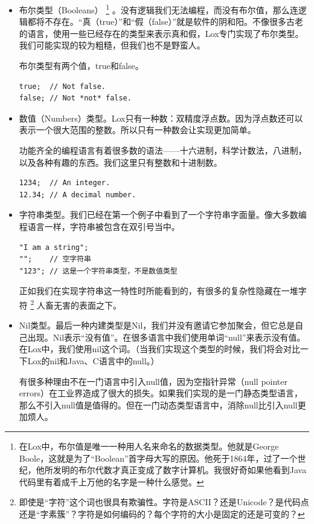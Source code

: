 \documentclass[cn,10pt,math=newtx,citestyle=gb7714-2015,bibstyle=gb7714-2015]{elegantbook}
\begin{document}
\begin{itemize}
\item 布尔类型（Booleans） \footnote{在Lox中，布尔值是唯一一种用人名来命名的数据类型。他就是George Boole，这就是为了“Boolean”首字母大写的原因。他死于1864年，过了一个世纪，他所发明的布尔代数才真正变成了数字计算机。我很好奇如果他看到Java代码里有着成千上万他的名字是一种什么感觉。} 。没有逻辑我们无法编程，而没有布尔值，那么连逻辑都将不存在。“真（true）”和“假（false）”就是软件的阴和阳。不像很多古老的语言，使用一些已经存在的类型来表示真和假，Lox专门实现了布尔类型。我们可能实现的较为粗糙，但我们也不是野蛮人。

布尔类型有两个值，true和false。

\begin{verbatim}
true;  // Not false.
false; // Not *not* false.
\end{verbatim}

\item 数值（Numbers）类型。Lox只有一种数：双精度浮点数。因为浮点数还可以表示一个很大范围的整数。所以只有一种数会让实现更加简单。

功能齐全的编程语言有着很多数的语法——十六进制，科学计数法，八进制，以及各种有趣的东西。我们这里只有整数和十进制数。

\begin{verbatim}
1234;  // An integer.
12.34; // A decimal number.
\end{verbatim}

\item 字符串类型。我们已经在第一个例子中看到了一个字符串字面量。像大多数编程语言一样，字符串被包含在双引号当中。

\begin{verbatim}
"I am a string";
"";    // 空字符串
"123"; // 这是一个字符串类型，不是数值类型
\end{verbatim}

正如我们在实现字符串这一特性时所能看到的，有很多的复杂性隐藏在一堆字符 \footnote{即使是“字符”这个词也很具有欺骗性。字符是ASCII？还是Unicode？是代码点还是“字素簇”？字符是如何编码的？每个字符的大小是固定的还是可变的？} 人畜无害的表面之下。

\item Nil类型。最后一种内建类型是Nil，我们并没有邀请它参加聚会，但它总是自己出现。Nil表示“没有值”。在很多语言中我们使用单词“null”来表示没有值。在Lox中，我们使用nil这个词。（当我们实现这个类型的时候，我们将会对比一下Lox的nil和Java、C语言中的null。）

有很多种理由不在一门语言中引入null值，因为空指针异常（null pointer errors）在工业界造成了很大的损失。如果我们实现的是一门静态类型语言，那么不引入null值是值得的。但在一门动态类型语言中，消除null比引入null更加烦人。
\end{itemize}
\end{document}

